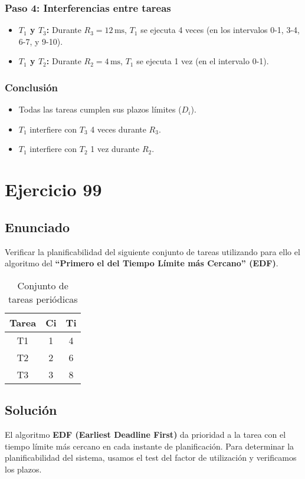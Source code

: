 \documentclass[a4paper,12pt]{article}
\begin{document}
\subsubsection{Paso 4: Interferencias entre tareas}
\begin{itemize}
    \item \textbf{\(T_1\) y \(T_3\):} Durante \(R_3 = 12 \, \text{ms}\), \(T_1\) se ejecuta 4 veces (en los intervalos 0-1, 3-4, 6-7, y 9-10).
    \item \textbf{\(T_1\) y \(T_2\):} Durante \(R_2 = 4 \, \text{ms}\), \(T_1\) se ejecuta 1 vez (en el intervalo 0-1).
\end{itemize}

\subsubsection{Conclusión}
\begin{itemize}
    \item Todas las tareas cumplen sus plazos límites (\(D_i\)).
    \item \(T_1\) interfiere con \(T_3\) 4 veces durante \(R_3\).
    \item \(T_1\) interfiere con \(T_2\) 1 vez durante \(R_2\).
\end{itemize}

\section{Ejercicio 99}
\subsection{Enunciado}
Verificar la planificabilidad del siguiente conjunto de tareas utilizando para ello el algoritmo del \textbf{“Primero el del Tiempo Límite más Cercano” (EDF)}.

\begin{table}[H]
\centering
\begin{tabular}{|c|c|c|}
\hline
\textbf{Tarea} & \textbf{Ci} & \textbf{Ti} \\ \hline
T1 & 1 & 4 \\ \hline
T2 & 2 & 6 \\ \hline
T3 & 3 & 8 \\ \hline
\end{tabular}
\caption{Conjunto de tareas periódicas}
\end{table}

\subsection{Solución}
El algoritmo \textbf{EDF (Earliest Deadline First)} da prioridad a la tarea con el tiempo límite más cercano en cada instante de planificación. Para determinar la planificabilidad del sistema, usamos el test del factor de utilización y verificamos los plazos.
\end{document}
